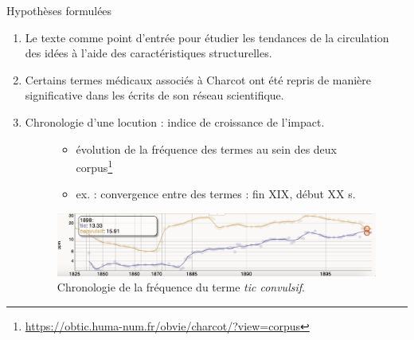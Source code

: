 \begin{frame}{Hypothèses formulées}
	\begin{enumerate}
		\item 	Le texte comme point d'entrée pour étudier les tendances de la circulation des idées à l'aide des caractéristiques structurelles.
			\begin{flushright}
			\small
			\parencite[p.~2]{milia2023}
		\end{flushright}
		
		\item Certains termes médicaux associés à Charcot ont été repris de manière significative dans les écrits de son réseau scientifique.
		
		\item Chronologie d'une locution : indice de croissance de l'impact.
			\begin{figure}[h] %
			\begin{itemize}
				\item évolution de la fréquence des termes au sein des deux corpus\footnote{\url{https://obtic.huma-num.fr/obvie/charcot/?view=corpus}}
				\item ex. : convergence entre des termes : fin \textsc{XIX}\ieme{}, début \textsc{XX}\ieme{} s.
			\end{itemize}
			\centering
			\includegraphics[width=\linewidth]{pic/tics_convulsifs.png}
			\caption{Chronologie de la fréquence du terme \textit{tic convulsif}.}
			\label{fig:ling_out_TAL}
		\end{figure}
	\end{enumerate}

	
%
\end{frame}

